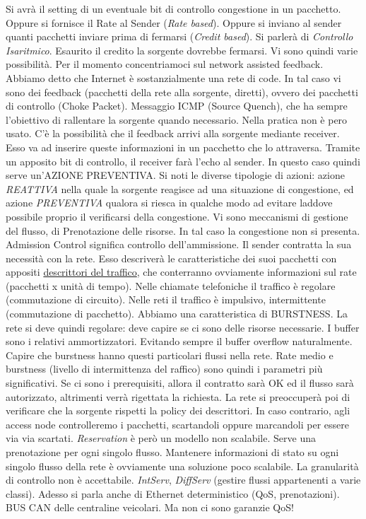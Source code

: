 Si avrà il setting di un eventuale bit di controllo congestione in un pacchetto. Oppure si fornisce il Rate al Sender (\textit{Rate based}). Oppure si inviano al sender quanti pacchetti inviare prima di fermarsi (\textit{Credit based}). Si parlerà di \textit{Controllo Isaritmico}. Esaurito il credito la sorgente dovrebbe fermarsi. Vi sono quindi varie possibilità. Per il momento concentriamoci sul network assisted feedback. Abbiamo detto che Internet è sostanzialmente una rete di code. In tal caso vi sono dei feedback (pacchetti della rete alla sorgente, diretti), ovvero dei pacchetti di controllo (Choke Packet). Messaggio ICMP (Source Quench), che ha sempre l'obiettivo di rallentare la sorgente quando necessario. Nella pratica non è pero usato. C'è la possibilità che il feedback arrivi alla sorgente mediante receiver. Esso va ad inserire queste informazioni in un pacchetto che lo attraversa. Tramite un apposito bit di controllo, il receiver farà l'echo al sender. In questo caso quindi serve un'AZIONE PREVENTIVA. Si noti le diverse tipologie di azioni: azione \textit{REATTIVA} nella quale la sorgente reagisce ad una situazione di congestione, ed azione \textit{PREVENTIVA} qualora si riesca in qualche modo ad evitare laddove possibile proprio il verificarsi della congestione. Vi sono meccanismi di gestione del flusso, di Prenotazione delle risorse. In tal caso la congestione non si presenta. Admission Control significa controllo dell'ammissione. Il sender contratta la sua necessità con la rete. Esso descriverà le caratteristiche dei suoi pacchetti con appositi \underline{descrittori del traffico}, che conterranno ovviamente informazioni sul rate (pacchetti x unità di tempo). Nelle chiamate telefoniche il traffico è regolare (commutazione di circuito). Nelle reti il traffico è impulsivo, intermittente (commutazione di pacchetto). Abbiamo una caratteristica di BURSTNESS. La rete si deve quindi regolare: deve capire se ci sono delle risorse necessarie. I buffer sono i relativi ammortizzatori. Evitando sempre il buffer overflow naturalmente. Capire che burstness hanno questi particolari flussi nella rete. Rate medio e burstness (livello di intermittenza del raffico) sono quindi i parametri più significativi. Se ci sono i prerequisiti, allora il contratto sarà OK ed il flusso sarà autorizzato, altrimenti verrà rigettata la richiesta. La rete si preoccuperà poi di verificare che la sorgente rispetti la policy dei descrittori. In caso contrario, agli access node controlleremo i pacchetti, scartandoli oppure marcandoli per essere via via scartati. \textit{Reservation} è però un modello non scalabile. Serve una prenotazione per ogni singolo flusso. Mantenere informazioni di stato su ogni singolo flusso della rete è ovviamente una soluzione poco scalabile. La granularità di controllo non è accettabile. \textit{IntServ}, \textit{DiffServ} (gestire flussi appartenenti a varie classi). Adesso si parla anche di Ethernet deterministico (QoS, prenotazioni). BUS CAN delle centraline veicolari. Ma non ci sono garanzie QoS!

